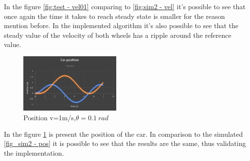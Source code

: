 In the figure \ref{fig:test - vel01} comparing to \ref{fig:sim2 - vel} it's possible to see that once again the time it takes to reach steady state is smaller for the reason mention before. In the implemented algorithm it's also possible to see that the steady value of the velocity of both wheels has a ripple around the reference value. 
\begin{figure}[!h]
\centering
\includegraphics[width=0.45\textwidth]{./img/testx1t01.PNG}
\caption {\label{fig:test - xy01}Position v=1m/s,$\theta = 0.1~\si{rad}$}
\end{figure}
In the figure \ref{fig:test - xy01} is present the position of the car. In comparison to the simulated \ref{fig_sim2 - pos} it is possible to see that the results are the same, thus validating the implementation.